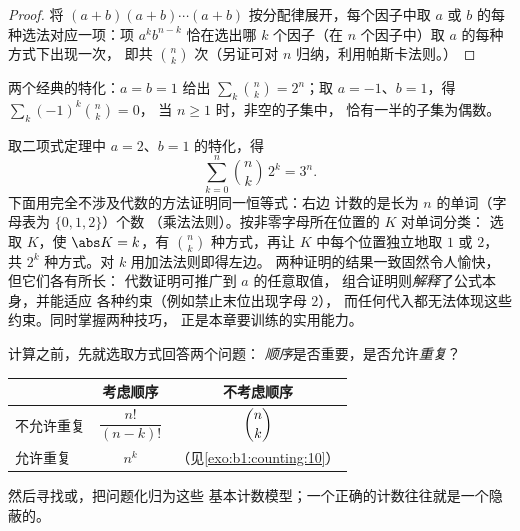 \begin{proof}
将 $(a+b)(a+b)\cdots(a+b)$ 按分配律展开，每个因子中取 $a$ 或 $b$
的每种选法对应一项：项 $a^k b^{n-k}$
恰在选出哪 $k$ 个因子（在 $n$ 个因子中）取 $a$ 的每种方式下出现一次，
即共 $\binom nk$ 次（另证可对
$n$ 归纳，利用帕斯卡法则。）
\end{proof}

\begin{example}\label{ex:b1:counting:binomial}
两个经典的特化：$a = b = 1$ 给出 $\sum_k \binom nk
= 2^n$；取 $a = -1$、$b = 1$，得 $\sum_{k} (-1)^k \binom nk = 0$，
当 $n \geq 1$ 时，非空的子集中，
恰有一半的子集为偶数。
\end{example}

\begin{example}\label{ex:b1:counting:threen}
取二项式定理中 $a = 2$、$b = 1$ 的特化，得
\[
\sum_{k=0}^{n} \binom nk\,2^k = 3^n .
\]
下面用完全不涉及代数的方法证明同一恒等式：右边
计数的是长为 $n$ 的单词（字母表为 $\{0, 1, 2\}$）个数
（乘法法则）。按非零字母所在位置的 $K$ 对单词分类：
选取 $K$，使 $\abs K = k$，有
$\binom nk$ 种方式，再让 $K$ 中每个位置独立地取 $1$
或 $2$，共 $2^k$ 种方式。对 $k$ 用加法法则即得左边。
两种证明的结果一致固然令人愉快，但它们各有所长：
代数证明可推广到 $a$ 的任意取值，
组合证明则\emph{解释}了公式本身，并能适应
各种约束（例如禁止末位出现字母 $2$），
而任何代入都无法体现这些约束。同时掌握两种技巧，
正是本章要训练的实用能力。
\end{example}

\begin{method}[该用哪种计数？]\label{met:b1:counting:which}
计算之前，先就选取方式回答两个问题：
\emph{顺序}是否重要，是否允许\emph{重复}？
\begin{center}
\renewcommand{\arraystretch}{1.4}
\begin{tabular}{l|c|c}
 & 考虑顺序 & 不考虑顺序 \\
\hline
不允许重复 & $\dfrac{n!}{(n-k)!}$ & $\dbinom{n}{k}$ \\[6pt]
允许重复 & $n^k$ & （见\cref{exo:b1:counting:10}） \\
\end{tabular}
\end{center}
然后寻找或，把问题化归为这些
基本计数模型；一个正确的计数往往就是一个隐蔽的。
\end{method}

